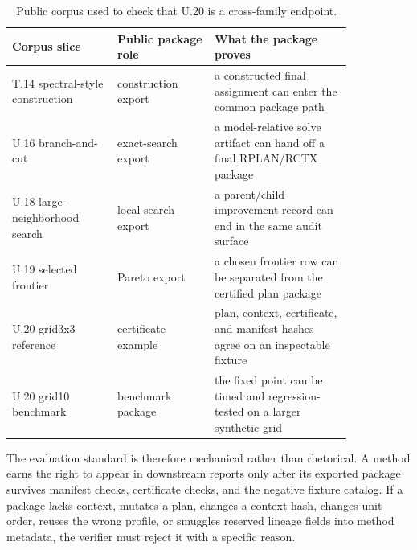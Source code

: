 \begin{table}[htbp]
\centering
\small
\begin{tabular}{p{0.26\linewidth}p{0.24\linewidth}p{0.34\linewidth}}
\toprule
Corpus slice & Public package role & What the package proves \\
\midrule
T.14 spectral-style construction & construction export & a constructed final
assignment can enter the common package path \\
U.16 branch-and-cut & exact-search export & a model-relative solve artifact can
hand off a final RPLAN/RCTX package \\
U.18 large-neighborhood search & local-search export & a parent/child
improvement record can end in the same audit surface \\
U.19 selected frontier & Pareto export & a chosen frontier row can be separated
from the certified plan package \\
U.20 grid3x3 reference & certificate example & plan, context, certificate, and
manifest hashes agree on an inspectable fixture \\
U.20 grid10 benchmark & benchmark package & the fixed point can be timed and
regression-tested on a larger synthetic grid \\
\bottomrule
\end{tabular}
\caption{Public corpus used to check that U.20 is a cross-family endpoint.}
\end{table}

The evaluation standard is therefore mechanical rather than rhetorical. A
method earns the right to appear in downstream reports only after its exported
package survives manifest checks, certificate checks, and the negative fixture
catalog. If a package lacks context, mutates a plan, changes a context hash,
changes unit order, reuses the wrong profile, or smuggles reserved lineage
fields into method metadata, the verifier must reject it with a specific reason.
